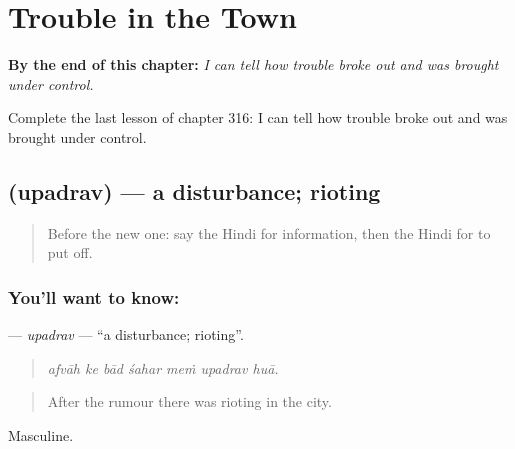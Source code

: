 
\chapter{Trouble in the Town}
\label{ch:hi-trouble-in-the-town}

\begin{chapteropening}
\textbf{By the end of this chapter:} \emph{I can tell how trouble broke out and was brought under control.}

Complete the last lesson of chapter 316: I can tell how trouble broke out and was brought under control.
\end{chapteropening}

\section[\texorpdfstring{\hi{उपद्रव} (upadrav)}{उपद्रव (upadrav)}]{ (upadrav) — a disturbance; rioting}

\label{lesson:HI-C316-upadrav}



\begin{quote}
Before the new one: say the Hindi for information, then the Hindi for to put off.
\end{quote}

\subsection*{You'll want to know: }
\textbf{} — \emph{upadrav} — \textquotedblleft{}a disturbance; rioting\textquotedblright{}.

\begin{quote}
      
\end{quote}

\begin{quote}
\emph{afvāh ke bād śahar meṁ upadrav huā.}
\end{quote}

\begin{quote}
After the rumour there was rioting in the city.
\end{quote}

Masculine.

